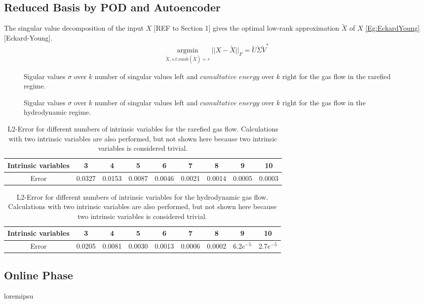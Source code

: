 \subsection{Reduced Basis by POD and Autoencoder}
The singular value decomposition of the input $X$ [REF to Section 1] gives the optimal low-rank approximation $\tilde{X}$ of $X$ \cref{Eg:EckardYoung}[Eckard-Young].
\begin{equation}
\underset{\tilde{X}, s.t. rank(\tilde{X})=r}{\operatorname{argmin}} || X -\tilde{X} ||_F=\tilde{U}\tilde{\Sigma}\tilde{V}^*
\label{Eq:EckardYoung}
\end{equation} 
\begin{figure}[!htbp]
	
	\caption{Sigular values \(\sigma\) over \(k\) number of singular values left and \(cumultative\) \(energy\) over \(k\) right for the gas flow in the rarefied regime.}
	\label{Fig:CumSum_Rare}
\end{figure}
\begin{figure}[!htbp]
	
	\caption{Sigular values \(\sigma\) over \(k\) number of singular values left and \(cumultative\) \(energy\) over \(k\) right for the gas flow in the hydrodynamic regime.}
	\label{Fig:CumSum_Hydro}
\end{figure}
\begin{table}[!htbp]\centering
\begin{tabular}{ |c|c|c|c|c|c|c|c|c| }
	\hline
	Intrinsic variables  & 3 & 4 & 5 & 6 & 7 & 8 & 9 & 10 \\ %
	\hline
	Error & 0.0327 & 0.0153 & 0.0087 & 0.0046 & 0.0021 & 0.0014 & 0.0005 & 0.0003\\ \hline
\end{tabular}
\caption{L2-Error for different numbers of intrinsic variables for the rarefied gas flow. Calculations with two intrinsic variables are also performed, but not shown here because two intrinsic variables is considered trivial.}
\label{Tab:Intrinsic units svd rare}
\end{table}
\begin{table}[!htbp]\centering
	\begin{tabular}{ |c|c|c|c|c|c|c|c|c| }
		\hline
		Intrinsic variables  & 3 & 4 & 5 & 6 & 7 & 8 & 9 & 10 \\ %
		\hline
		Error & 0.0205 & 0.0081 & 0.0030 & 0.0013 & 0.0006 & 0.0002 & 6.2\(e^{-5}\) & 2.7\(e^{-5}\)\\ \hline
	\end{tabular}
	\caption{L2-Error for different numbers of intrinsic variables for the hydrodynamic gas flow. Calculations with two intrinsic variables are also performed, but not shown here because two intrinsic variables is considered trivial.}
	\label{Tab:Intrinsic units svd hydro}
\end{table}
\textbf{}\subsection{Online Phase}
loremipsu
